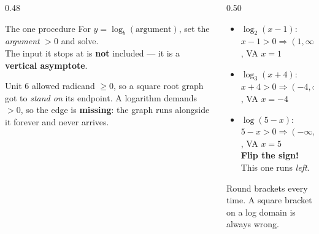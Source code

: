 \documentclass[aspectratio=169, 11pt]{beamer}
\begin{document}
\begin{frame}[t, plain]
  \begin{columns}[T]
    \begin{column}{0.48\textwidth}
      \begin{block}{The one procedure}
        For $y=\log_b(\text{argument})$, set the \emph{argument} $>0$ and solve. \\[3pt]
        The input it stops at is \textbf{not} included --- it is a \textbf{vertical asymptote}.
      \end{block}
      \vspace{4pt}
      {\footnotesize Unit 6 allowed radicand $\ge 0$, so a square root graph got to \emph{stand on}
      its endpoint. A logarithm demands $>0$, so the edge is \textbf{missing}: the graph runs
      alongside it forever and never arrives.}
    \end{column}
    \begin{column}{0.50\textwidth}
      \begin{itemize}\setlength{\itemsep}{5pt}
        \item $\log_2(x-1)$: \; $x-1>0 \Rightarrow (1,\infty)$, \; VA $x=1$
        \item $\log_3(x+4)$: \; $x+4>0 \Rightarrow (-4,\infty)$, \; VA $x=-4$
        \item $\log(5-x)$: \; $5-x>0 \Rightarrow (-\infty,5)$, \; VA $x=5$ \\
              {\footnotesize \textbf{Flip the sign!} This one runs \emph{left}.}
      \end{itemize}
      \vspace{4pt}
      {\footnotesize Round brackets every time. A square bracket on a log domain is always wrong.}
    \end{column}
  \end{columns}
\end{frame}
\end{document}
